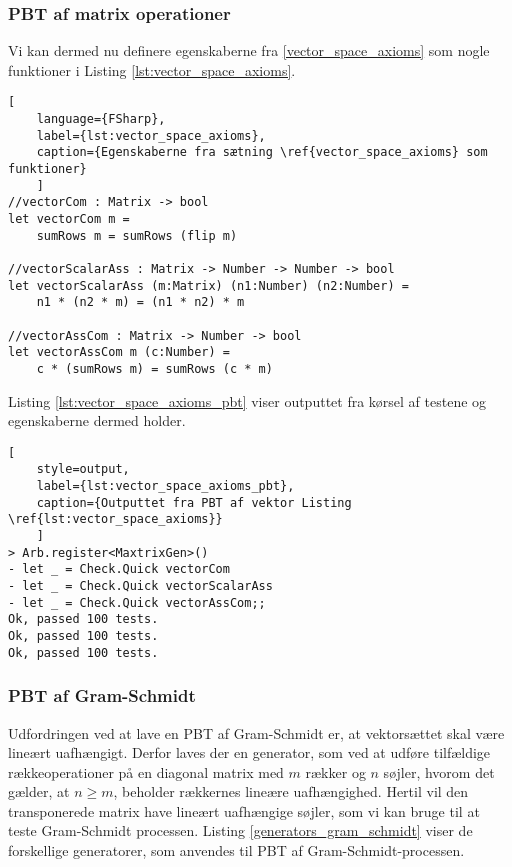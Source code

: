 \subsubsection{PBT af matrix operationer}
Vi kan dermed nu definere egenskaberne fra \ref{vector_space_axioms} som nogle funktioner i Listing \ref{lst:vector_space_axioms}.

\begin{lstlisting}[
    language={FSharp}, 
    label={lst:vector_space_axioms}, 
    caption={Egenskaberne fra sætning \ref{vector_space_axioms} som funktioner}
    ]
//vectorCom : Matrix -> bool
let vectorCom m =
    sumRows m = sumRows (flip m)

//vectorScalarAss : Matrix -> Number -> Number -> bool
let vectorScalarAss (m:Matrix) (n1:Number) (n2:Number) =
    n1 * (n2 * m) = (n1 * n2) * m

//vectorAssCom : Matrix -> Number -> bool
let vectorAssCom m (c:Number) =
    c * (sumRows m) = sumRows (c * m)
\end{lstlisting}

Listing \ref{lst:vector_space_axioms_pbt} viser outputtet fra kørsel af testene og egenskaberne dermed holder.

\begin{lstlisting}[
    style=output, 
    label={lst:vector_space_axioms_pbt}, 
    caption={Outputtet fra PBT af vektor Listing \ref{lst:vector_space_axioms}}
    ]
> Arb.register<MaxtrixGen>()
- let _ = Check.Quick vectorCom
- let _ = Check.Quick vectorScalarAss
- let _ = Check.Quick vectorAssCom;;
Ok, passed 100 tests.
Ok, passed 100 tests.
Ok, passed 100 tests.
\end{lstlisting}

\subsubsection{PBT af Gram-Schmidt}\label{sec:pbt_gram_schmidt}
Udfordringen ved at lave en PBT af Gram-Schmidt er, at vektorsættet skal være lineært uafhængigt. Derfor laves der en generator, som ved at udføre tilfældige rækkeoperationer på en diagonal matrix med \( m \) rækker og \( n \) søjler, hvorom det gælder, at \( n \geq m \), beholder rækkernes lineære uafhængighed. Hertil vil den transponerede matrix have lineært uafhængige søjler, som vi kan bruge til at teste Gram-Schmidt processen. Listing \ref{generators_gram_schmidt} viser de forskellige generatorer, som anvendes til PBT af Gram-Schmidt-processen.

